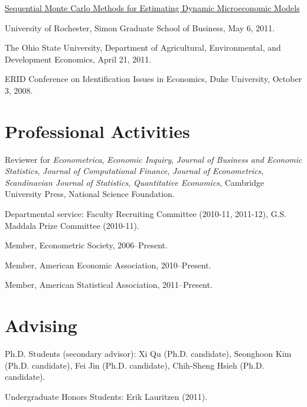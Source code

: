 \documentclass[10pt,letterpaper]{article}
\renewenvironment{itemize}{
  \begin{list}{}{
    \setlength{\leftmargin}{1.5em}
    \setlength{\itemsep}{0.25em}
    \setlength{\parskip}{0pt}
    \setlength{\parsep}{0.25em}
  }
}{
  \end{list}
}
\begin{document}
\begin{itemize}
\item \href{http://jblevins.org/research/smcdmm}{Sequential Monte Carlo Methods for Estimating Dynamic Microeconomic Models}

  \begin{itemize}
  \item University of Rochester, Simon Graduate School of Business,
    May 6, 2011.
  \item The Ohio State University,
    Department of Agricultural, Environmental, and Development Economics,
    April 21, 2011.
  \item ERID Conference on Identification Issues in Economics,
    Duke University, October 3, 2008.
  \end{itemize}

\end{itemize}

\section*{Professional Activities}

\begin{itemize}
\item Reviewer for
  \textit{Econometrica}, %
  \textit{Economic Inquiry}, %
  \textit{Journal of Business and Economic Statistics}, %
  \textit{Journal of Computational Finance}, %
  \textit{Journal of Econometrics}, %
  \textit{Scandinavian Journal of Statistics}, %
  \textit{Quantitative Economics}, %
  Cambridge University Press, %
  National Science Foundation. %
\item Departmental service:
  Faculty Recruiting Committee (2010-11, 2011-12),
  G.S. Maddala Prize Committee (2010-11).
\item Member, Econometric Society, 2006--Present.
\item Member, American Economic Association, 2010--Present.
\item Member, American Statistical Association, 2011--Present.
\end{itemize}

\section*{Advising}

\begin{itemize}
\item Ph.D. Students (secondary advisor):
  Xi Qu (Ph.D. candidate),            %
  Seonghoon Kim (Ph.D. candidate),    %
  Fei Jin (Ph.D. candidate),          %
  Chih-Sheng Hsieh (Ph.D. candidate). %

\item Undergraduate Honors Students:
  Erik Lauritzen (2011).              %
\end{itemize}
\end{document}
